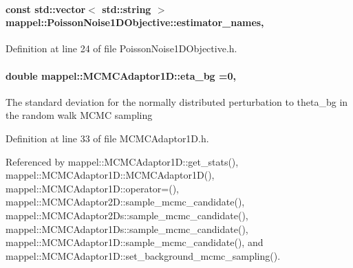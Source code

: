 \paragraph[{\texorpdfstring{estimator\+\_\+names}{estimator_names}}]{\setlength{\rightskip}{0pt plus 5cm}const std\+::vector$<$ std\+::string $>$ mappel\+::\+Poisson\+Noise1\+D\+Objective\+::estimator\+\_\+names\hspace{0.3cm}{\ttfamily [static]}, {\ttfamily [inherited]}}\hypertarget{classmappel_1_1PoissonNoise1DObjective_a985200133fb3e5bfdf8755296cf700eb}{}\label{classmappel_1_1PoissonNoise1DObjective_a985200133fb3e5bfdf8755296cf700eb}


Definition at line 24 of file Poisson\+Noise1\+D\+Objective.\+h.

\paragraph[{\texorpdfstring{eta\+\_\+bg}{eta_bg}}]{\setlength{\rightskip}{0pt plus 5cm}double mappel\+::\+M\+C\+M\+C\+Adaptor1\+D\+::eta\+\_\+bg =0\hspace{0.3cm}{\ttfamily [protected]}, {\ttfamily [inherited]}}\hypertarget{classmappel_1_1MCMCAdaptor1D_af54c93421b8e298289cbb92743c6b3d5}{}\label{classmappel_1_1MCMCAdaptor1D_af54c93421b8e298289cbb92743c6b3d5}
The standard deviation for the normally distributed perturbation to theta\+\_\+bg in the random walk M\+C\+MC sampling 

Definition at line 33 of file M\+C\+M\+C\+Adaptor1\+D.\+h.



Referenced by mappel\+::\+M\+C\+M\+C\+Adaptor1\+D\+::get\+\_\+stats(), mappel\+::\+M\+C\+M\+C\+Adaptor1\+D\+::\+M\+C\+M\+C\+Adaptor1\+D(), mappel\+::\+M\+C\+M\+C\+Adaptor1\+D\+::operator=(), mappel\+::\+M\+C\+M\+C\+Adaptor2\+D\+::sample\+\_\+mcmc\+\_\+candidate(), mappel\+::\+M\+C\+M\+C\+Adaptor2\+Ds\+::sample\+\_\+mcmc\+\_\+candidate(), mappel\+::\+M\+C\+M\+C\+Adaptor1\+Ds\+::sample\+\_\+mcmc\+\_\+candidate(), mappel\+::\+M\+C\+M\+C\+Adaptor1\+D\+::sample\+\_\+mcmc\+\_\+candidate(), and mappel\+::\+M\+C\+M\+C\+Adaptor1\+D\+::set\+\_\+background\+\_\+mcmc\+\_\+sampling().

